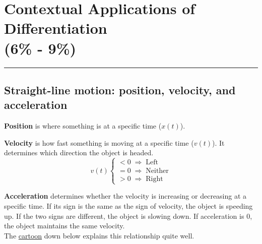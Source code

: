 \documentclass[12pt]{article}
\newcommand{\fline}{\par\noindent\rule{\textwidth}{0.1pt}} %
\begin{document}
\section[Contextual Applications of Differentiation (6\% - 9\%)]{Contextual Applications of Differentiation \\(6\% - 9\%)}
\fline

\subsection{Straight-line motion: position, velocity, and acceleration}
\noindent \textbf{Position} is where something is at a specific time ($x(t)$).

\noindent \textbf{Velocity} is how fast something is moving at a specific time ($v(t)$). It determines which direction the object is headed.
\[ v(t) \begin{cases}
        <0 \; \Rightarrow \; \text{Left}    \\
        =0 \; \Rightarrow \; \text{Neither} \\
        >0 \; \Rightarrow \; \text{Right}
    \end{cases} \]

\noindent \textbf{Acceleration} determines whether the velocity is increasing or decreasing at a specific time. If its sign is the same as the sign of velocity, the object is speeding up. If the two signs are different, the object is slowing down. If acceleration is $0$, the object maintains the same velocity.
\\ The \hyperref[fig:posveloaccel]{cartoon} down below explains this relationship quite well.
\end{document}
